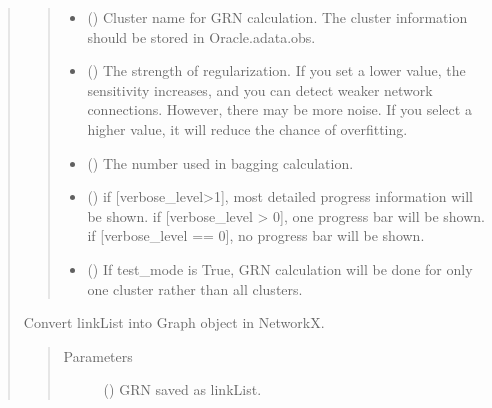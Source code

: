 \documentclass[letterpaper,10pt,english]{sphinxmanual}
\begin{document}
\begin{quote}
\begin{fulllineitems}
\begin{quote}
\begin{description}
\begin{itemize}
\item {} 
 () \textendash{} Cluster name for GRN calculation. The cluster information should be stored in Oracle.adata.obs.

\item {} 
 () \textendash{} The strength of regularization.
If you set a lower value, the sensitivity increases, and you can detect weaker network connections. However, there may be more noise.
If you select a higher value, it will reduce the chance of overfitting.

\item {} 
 () \textendash{} The number used in bagging calculation.

\item {} 
 () \textendash{} if {[}verbose\_level\textgreater{}1{]}, most detailed progress information will be shown.
if {[}verbose\_level \textgreater{} 0{]}, one progress bar will be shown.
if {[}verbose\_level == 0{]}, no progress bar will be shown.

\item {} 
 () \textendash{} If test\_mode is True, GRN calculation will be done for only one cluster rather than all clusters.

\end{itemize}

\end{description}\end{quote}

\end{fulllineitems}


\begin{fulllineitems}
\label{\detokenize{modules/celloracle.network_analysis:celloracle.network_analysis.linkList_to_networkgraph}}
Convert linkList into Graph object in NetworkX.
\begin{quote}\begin{description}
\item[{Parameters}] \leavevmode
{} () \textendash{} GRN saved as linkList.


\end{description}
\end{quote}
\end{fulllineitems}
\end{quote}
\end{document}
